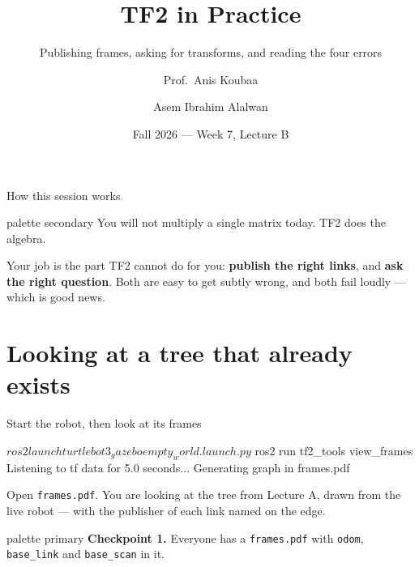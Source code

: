 \documentclass[aspectratio=169]{beamer}
\title[EE 414 --- Week 7B]{TF2 in Practice}
\subtitle{Publishing frames, asking for transforms, and reading the four errors}
\author[Koubaa \and Alalwan]{Prof.\ Anis Koubaa \and Asem Ibrahim Alalwan}
\institute[Alfaisal University]{
    EE 414 --- Introduction to Robotics\\
    College of Engineering\\
    Alfaisal University
}
\date{Fall 2026 --- Week 7, Lecture B}
\begin{document}
\begin{frame}[plain]
  \titlepage
\end{frame}

\begin{frame}{How this session works}
  \begin{beamercolorbox}[sep=8pt,center,rounded=true]{palette secondary}
    \small You will not multiply a single matrix today. TF2 does the algebra.
  \end{beamercolorbox}

  \vspace{0.7em}
  \small
  Your job is the part TF2 cannot do for you: \textbf{publish the right links}, and
  \textbf{ask the right question}. Both are easy to get subtly wrong, and both fail loudly ---
  which is good news.

  \vspace{0.5em}
  {\scriptsize\tableofcontents[hideallsubsections]}
\end{frame}

\section{Looking at a tree that already exists}

\begin{frame}[fragile]{Start the robot, then look at its frames}
  \begin{shells}
$ ros2 launch turtlebot3_gazebo empty_world.launch.py

$ ros2 run tf2_tools view_frames
Listening to tf data for 5.0 seconds...
Generating graph in frames.pdf
  \end{shells}

  \vspace{0.4em}
  \small
  Open \texttt{frames.pdf}. You are looking at the tree from Lecture A, drawn from the live
  robot --- with the publisher of each link named on the edge.

  \vspace{0.3em}
  \centering
  \begin{beamercolorbox}[sep=5pt,center,rounded=true]{palette primary}
    \footnotesize \textbf{Checkpoint 1.} Everyone has a \texttt{frames.pdf} with
    \texttt{odom}, \texttt{base\_link} and \texttt{base\_scan} in it.
  \end{beamercolorbox}
\end{frame}
\end{document}
